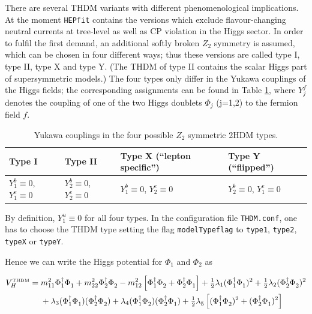 \documentclass[preprint,3p,12pt]{elsarticle}
\newcommand{\HEPfit}{\texttt{HEPfit}\xspace}
\begin{document}
{There are several THDM variants with different phenomenological implications. At the moment \HEPfit contains the versions which exclude flavour-changing neutral currents at tree-level as well as CP violation in the Higgs sector. In order to fulfil the first demand, an additional softly broken $Z_2$ symmetry is assumed, which can be chosen in four different ways; thus these versions are called type I, type II, type X and type Y. (The THDM of type II contains the scalar Higgs part of supersymmetric models.) The four types only differ in the Yukawa couplings of the Higgs fields; the corresponding assignments can be found in Table \ref{tab:THDMtypes}, where $Y^f_j$ denotes the coupling of one of the two Higgs doublets $\Phi_j$ (j=1,2) to the fermion field $f$.

\begin{table}[htb]
  \centering
\caption{Yukawa couplings in the four possible $Z_2$ symmetric 2HDM types.}\vspace{0.2cm}
  \begin{tabular}{|l|l|l|l|}
    \hline
      Type I & Type II & Type X (``lepton specific'') & Type Y (``flipped'') \\
    \hline
      $Y^b_{1}\equiv 0$, $Y^e_{1}\equiv 0$ & $Y^b_{2}\equiv 0$, $Y^e_{2}\equiv 0$ & $Y^b_{1}\equiv 0$, $Y^e_{2}\equiv 0$ & $Y^b_{2}\equiv 0$, $Y^e_{1}\equiv 0$ \\
      \hline
  \end{tabular}
 \label{tab:THDMtypes}
\end{table} 

By definition, $Y_1^u \equiv 0$ for all four types. In the configuration file \texttt{THDM.conf}, one has to choose the THDM type setting the flag \texttt{modelTypeflag} to \texttt{type1}, \texttt{type2}, \texttt{typeX} or \texttt{typeY}.

Hence we can write the Higgs potential for $\Phi_1$ and $\Phi_2$ as

\begin{align}
V_H^\text{\tiny{THDM}} & = m_{11}^2\Phi_1^\dagger\Phi_1^{\phantom{\dagger}}
 	+m_{22}^2\Phi_2^\dagger\Phi_2^{\phantom{\dagger}}
 	-m_{12}^2\left[ \Phi_1^\dagger\Phi_2^{\phantom{\dagger}}
 		+\Phi_2^\dagger\Phi_1^{\phantom{\dagger}}\right] 
	+\tfrac12 \lambda_1(\Phi_1^\dagger\Phi_1^{\phantom{\dagger}})^2 
	+\tfrac12 \lambda_2(\Phi_2^\dagger\Phi_2^{\phantom{\dagger}})^2 \nonumber \\
&\phantom{{}={}}
 	+\lambda_3(\Phi_1^\dagger\Phi_1^{\phantom{\dagger}})
 		(\Phi_2^\dagger\Phi_2^{\phantom{\dagger}})
 	+\lambda_4(\Phi_1^\dagger\Phi_2^{\phantom{\dagger}})
 		(\Phi_2^\dagger\Phi_1^{\phantom{\dagger}})
	+\tfrac12 \lambda_5^{} \left[ (\Phi_1^\dagger\Phi_2^{\phantom{\dagger}})^2
 		+(\Phi_2^\dagger\Phi_1^{\phantom{\dagger}})^2 \right] \label{eq:THDMVH}
\end{align}
 
}
\end{document}
